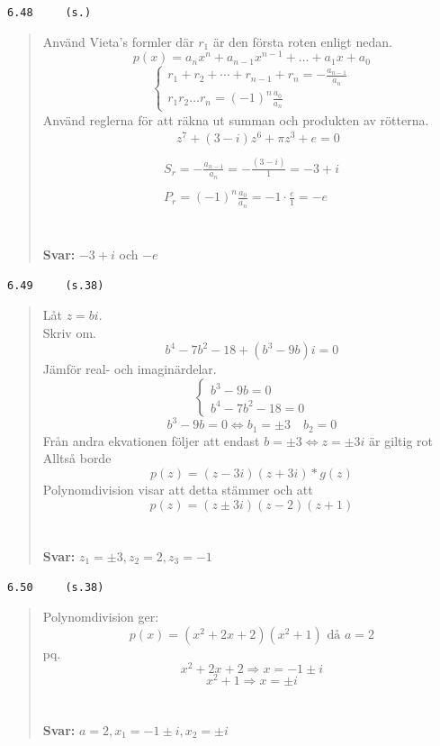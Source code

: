 \documentclass[a4paper]{article}
\newcommand{\tskcol}[1]{\textcolor{tskcol}{#1}}
\begin{document}
	\texttt{\tskcol{6.48~~~~ (s.)}}
	\begin{quotation}
		\noindent
		Använd Vieta's formler där $r_1$ är den första roten enligt nedan.
		\begin{equation*}
			p(x)=a_{n} x^{n}+a_{n-1} x^{n-1}+\ldots+a_{1} x+a_{0}
			\end{equation*}
			\begin{equation*}
				\left\{\begin{array}{l}
				r_{1}+r_{2}+\cdots+r_{n-1}+r_{n}=-\frac{a_{n-1}}{a_{n}} \\
				r_{1} r_{2} \ldots r_{n}=(-1)^{n} \frac{a_{0}}{a_{n}}
				\end{array}\right.
				\end{equation*}
		Använd reglerna för att räkna ut summan och produkten av rötterna.
		\begin{equation*}
			\begin{array}{l}
			\quad z^{7}+(3-i) z^{6}+\pi z^{3}+e=0 \\\\
			S_{r}=-\frac{a_{n-1}}{a_{n}}=-\frac{(3-i)}{1}=-3+i \\\\
			P_{r}=(-1)^{n} \frac{a_{0}}{a_{n}}=-1 \cdot \frac{e}{1}=-e
			\end{array}
			\end{equation*}
		\\ \\
		\textbf{Svar:} $-3+i$ och $-e$
	\end{quotation}
	
	\texttt{\tskcol{6.49~~~~ (s.38)}}
	\begin{quotation}
		\noindent
		Låt \(z=bi\).\\
		Skriv om.
		\[b^4-7b^2-18+(b^3-9b)i=0\]
		Jämför real- och imaginärdelar.
		\[\begin{cases}
			b^3-9b=0\\
			b^4-7b^2-18=0
		\end{cases}\]
		\[b^3-9b = 0 \Leftrightarrow b_1=\pm3\quad b_2=0\]
		Från andra ekvationen följer att endast $b=\pm3\Leftrightarrow z=\pm3i $ är giltig rot\\
		Alltså borde 
		\[p(z)=(z-3i)(z+3i) * g(z)\]
		Polynomdivision visar att detta stämmer och att
		\[p(z)=(z\pm3i)(z-2)(z+1) \]
		\\ \\
		\textbf{Svar:} $z_1=\pm3,z_2=2,z_3=-1$
	\end{quotation}
	
	\texttt{\tskcol{6.50~~~~ (s.38)}}
	\begin{quotation}
		\noindent
		Polynomdivision ger:
		\[p(x) = (x^2+2x+2)(x^2+1) \textrm{  då  }a=2\]
		pq.  \[x^2+2x+2\Longrightarrow x=-1\pm i\]
		\[x^2+1\Rightarrow x=\pm i\] 
		\\ \\
		\textbf{Svar:} $a=2,x_1=-1 \pm i,x_2=\pm i$
	\end{quotation}
	
\end{document}
